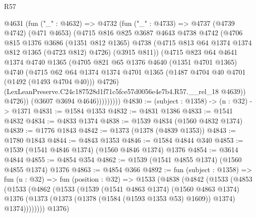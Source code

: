 \begin{lexlean}{R57}
\begin{coremodule}
              @4631
                (fun ("_" : @4632) =>
                @4732
                  (fun ("_" : @4733) =>
                  @4737
                    (@4739 @4742)
                    (@471 @4653)
                    (@4715
                      @816
                      @825
                      @3687
                      @4643
                      @4738
                      @4742
                      (@4706
                        @815
                        @1376
                        @3686
                        (@1351 @812 @1365)
                        @4738
                        (@4715 @813 @64 @1374 @1374 @812 @1365 (@4723 @812) @4726)
                        (@3915 @811))
                      (@4715
                        @823
                        @64
                        @4641
                        @1374
                        @4740
                        @1365
                        (@4705
                          @821
                          @65
                          @1376
                          @4640
                          (@1351 @4701 @1365)
                          @4740
                          (@4715
                            @62
                            @64
                            @1374
                            @1374
                            @4701
                            @1365
                            (@1487 @4704 @40 @4701 (@1492 (@1493 @4704 @40)))
                            @4726)
                          (LexLeanPreserve.C24c187528d1f71c5fce57d0056e4e7b4.R57.__rel_18 @4639))
                        @4726))
                    (@3607 @3694 @4646)))))))))
@4830 := (subject : @1358) -> (n : @32) -> @1371
@4831 := @1584 @1353
@4832 := @4831 @1386
@4833 := @1541 @4832
@4834 := @4833 @1374
@4838 := @1539 @4834 (@1560 @4832 @1374)
@4839 := @1776 @1843
@4842 := @1373 (@1378 (@4839 @1353))
@4843 := @1780 @1843
@4844 := @4843 @1353
@4846 := @1584 @4844 @340
@4853 := @1539 (@1541 @4846 @1374) (@1560 @4846 @1374) @1376
@4854 := @3614 @4844
@4855 := @4854 @354
@4862 := @1539 (@1541 @4855 @1374) (@1560 @4855 @1374) @1376
@4863 := @4854 @366
@4892 := fun (subject : @1358) =>
  fun (n : @32) =>
  fun (position : @32) =>
  @1533
    (@4838
      (@4842
        (@1533
          (@4853
            (@1533
              (@4862
                (@1533
                  (@1539
                    (@1541 @4863 @1374)
                    (@1560 @4863 @1374)
                    @1376
                    (@1373 (@1373 (@1378 (@1584 (@1593 @1353 @53) @1609)) @1374) @1374))))))))
      @1376)

\end{coremodule}
\end{lexlean}
